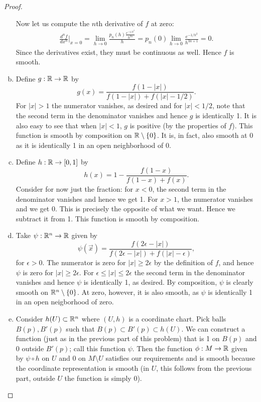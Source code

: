 \documentclass{../../mathnotes}
\begin{document}
\begin{proof}
\begin{enumerate}[(a)]
            Now let us compute the $n$th derivative of $f$ at zero:
            \begin{align*}
                \frac{d^nf}{dx^n}\bigg|_{x=0}=\lim_{h\to 0}\frac{p_n(h)\frac{e^{-1/h^2}}{h^{3n}}}{h}=p_n(0)\lim_{h\to0}\frac{e^{-1/h^2}}{h^{3n+1}}=0.
            \end{align*}
            Since the derivatives exist, they must be continuous as well. Hence $f$ is smooth.
        \item Define $g:\mathbb{R}\to\mathbb{R}$ by
            \[g(x)=\frac{f(1 - |x|)}{f(1 - |x|)+f(|x|-1/2)}.\]
            For $|x|>1$ the numerator vanishes, as desired and for $|x|<1/2$, note that the second term in the denominator vanishes and hence $g$ is identically 1.
            It is also easy to see that when $|x|<1$, $g$ is positive (by the properties of $f$). This function is smooth by composition on $\mathbb{R}\setminus\{0\}$.
            It is, in fact, also smooth at 0 as it is identically 1 in an open neighborhood of 0.
        \item Define $h:\mathbb{R}\to[0,1]$ by
            \[h(x)=1-\frac{f(1 - x)}{f(1 - x)+f(x)}.\]
            Consider for now just the fraction: for $x<0$, the second term in the denominator vanishes and hence we get 1. For $x>1$, the numerator vanishes and we get 0.
            This is precisely the opposite of what we want. Hence we subtract it from 1. This function is smooth by composition.
        \item Take $\psi:\mathbb{R}^n\to\mathbb{R}$ given by
            \[\psi(\vec x)=\frac{f(2\epsilon - |x|)}{f(2\epsilon - |x|)+f(|x|-\epsilon)},\]
            for $\epsilon>0$.
            The numerator is zero for $|x|\geq 2\epsilon$ by the definition of $f$, and hence $\psi$ is zero for $|x|\geq 2\epsilon$.
            For $\epsilon\leq |x|\leq 2\epsilon$ the second term in the denominator vanishes and hence $\psi$ is identically 1, as desired.
            By composition, $\psi$ is clearly smooth on $\mathbb{R}^n\setminus\{0\}$. At zero, however, it is also smooth, as $\psi$ is identically 1
            in an open neigborhood of zero.
        \item Consider $h(U)\subset\mathbb{R}^n$ where $(U,h)$ is a coordinate chart. Pick balls $B(p), B'(p)$ such that $B(p)\subset B'(p)\subset h(U)$.
            We can construct a function (just as in the previous part of this problem) that is 1 on $B(p)$ and 0 outside $B'(p)$; call this function $\psi$.
            Then the function $\phi:M\to\mathbb{R}$ given by $\psi\circ h$ on $U$ and 0 on $M\setminus U$ satisfies our requirements and is smooth because the
            coordinate representation is smooth (in $U$, this follows from the previous part, outside $U$ the function is simply 0).
    \end{enumerate}
\end{proof}
\end{document}
